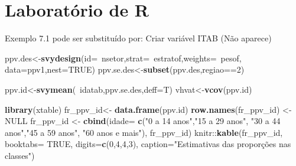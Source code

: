 \documentclass[]{book}
\newenvironment{Shaded}{\begin{snugshade}}{\end{snugshade}}
\newcommand{\KeywordTok}[1]{\textcolor[rgb]{0.13,0.29,0.53}{\textbf{{#1}}}}
\newcommand{\DataTypeTok}[1]{\textcolor[rgb]{0.13,0.29,0.53}{{#1}}}
\newcommand{\DecValTok}[1]{\textcolor[rgb]{0.00,0.00,0.81}{{#1}}}
\newcommand{\StringTok}[1]{\textcolor[rgb]{0.31,0.60,0.02}{{#1}}}
\newcommand{\OtherTok}[1]{\textcolor[rgb]{0.56,0.35,0.01}{{#1}}}
\newcommand{\NormalTok}[1]{{#1}}
\numberwithin{example}{chapter}
\numberwithin{remark}{chapter}
\numberwithin{definition}{chapter}
\begin{document}
\section{Laboratório de R}\label{laboratorio-de-r-4}

Exemplo 7.1 pode ser substituído por: Criar variável ITAB (Não aparece)

\begin{Shaded}
\begin{Highlighting}[]
\NormalTok{ppv.des<-}\KeywordTok{svydesign}\NormalTok{(}\DataTypeTok{id=}\NormalTok{~nsetor,}\DataTypeTok{strat=}\NormalTok{~estratof,}\DataTypeTok{weights=}\NormalTok{~pesof,}
\DataTypeTok{data=}\NormalTok{ppv1,}\DataTypeTok{nest=}\OtherTok{TRUE}\NormalTok{)}
\NormalTok{ppv.se.des<-}\KeywordTok{subset}\NormalTok{(ppv.des,regiao==}\DecValTok{2}\NormalTok{)}
\end{Highlighting}
\end{Shaded}

\begin{Shaded}
\begin{Highlighting}[]
\NormalTok{ppv.id<-}\KeywordTok{svymean}\NormalTok{(~idatab,ppv.se.des,}\DataTypeTok{deff=}\NormalTok{T)}
\NormalTok{vhvat<-}\KeywordTok{vcov}\NormalTok{(ppv.id)}
\end{Highlighting}
\end{Shaded}

\begin{Shaded}
\begin{Highlighting}[]
\KeywordTok{library}\NormalTok{(xtable)}
\NormalTok{fr_ppv_id<-}\StringTok{ }\KeywordTok{data.frame}\NormalTok{(ppv.id)}
\KeywordTok{row.names}\NormalTok{(fr_ppv_id) <-}\StringTok{ }\OtherTok{NULL}
\NormalTok{fr_ppv_id <-}\StringTok{ }\KeywordTok{cbind}\NormalTok{(}\DataTypeTok{idade=} \KeywordTok{c}\NormalTok{(}\StringTok{"0 a 14 anos"}\NormalTok{,}\StringTok{"15 a 29 anos"}\NormalTok{, }\StringTok{"30 a 44 anos"}\NormalTok{,}\StringTok{"45 a 59 anos"}\NormalTok{, }\StringTok{"60 anos e mais"}\NormalTok{), fr_ppv_id)}
\NormalTok{knitr::}\KeywordTok{kable}\NormalTok{(fr_ppv_id, }\DataTypeTok{booktabs=} \OtherTok{TRUE}\NormalTok{, }\DataTypeTok{digits=}\KeywordTok{c}\NormalTok{(}\DecValTok{0}\NormalTok{,}\DecValTok{4}\NormalTok{,}\DecValTok{4}\NormalTok{,}\DecValTok{3}\NormalTok{), }\DataTypeTok{caption=}\StringTok{"Estimativas das proporções nas classes"}\NormalTok{) }
\end{Highlighting}
\end{Shaded}
\end{document}
